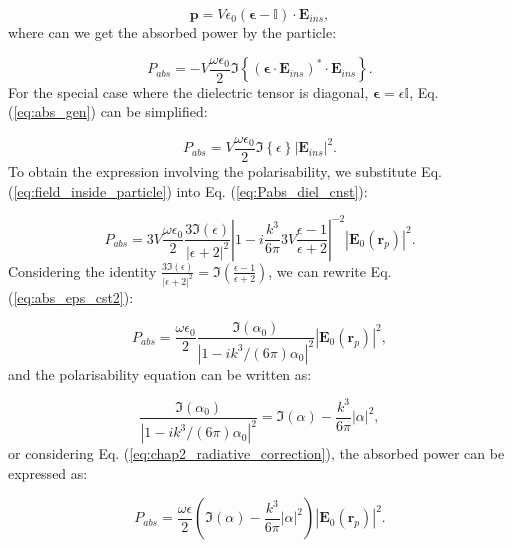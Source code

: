 \begin{equation}
\mathbf{p} = V\epsilon_{0}\left(\boldsymbol{\epsilon}-\mathbb{I}\right)\cdot\mathbf{E}_{ins},
\end{equation}
where can we get the absorbed power by the particle:

\begin{equation}
P_{abs} = -V\frac{\omega \epsilon_0}{2}\Im{\left\{\left(\boldsymbol{\epsilon}\cdot\mathbf{E}_{ins}\right)^{*}\cdot\mathbf{E}_{ins}\right\}}.\label{eq:abs_gen}
\end{equation}
For the special case where the dielectric tensor is diagonal, $\boldsymbol{\epsilon}=\epsilon\mathbb{I}$, Eq. (\ref{eq:abs_gen}) can be simplified:

\begin{equation}
P_{abs} = V\frac{\omega \epsilon_0}{2}\Im{\left\{\epsilon\right\}}\left|\mathbf{E}_{ins}\right|^2.\label{eq:Pabs_diel_cnst}
\end{equation}
To obtain the expression involving the polarisability, we substitute Eq. (\ref{eq:field_inside_particle}) into Eq. (\ref{eq:Pabs_diel_cnst}):

\begin{equation}
P_{abs} = 3V\frac{\omega \epsilon_{0}}{2}\frac{3\Im\left(\epsilon\right)}{\left|\epsilon+2\right|^2}\left|1-i\frac{k^3}{6\pi}3V\frac{\epsilon-1}{\epsilon + 2}\right|^{-2}\left|\mathbf{E}_{0}\left(\mathbf{r}_{p}\right)\right|^2.\label{eq:abs_eps_cst2}
\end{equation}
Considering the identity $ \frac{3\Im{\left(\epsilon\right)}}{\left|\epsilon+2\right|^2}=\Im{\left(\frac{\epsilon-1}{\epsilon + 2}\right)}$, we can rewrite Eq. (\ref{eq:abs_eps_cst2}):

\begin{equation}
P_{abs}= \frac{\omega\epsilon_0}{2}\frac{\Im{\left(\alpha_{0}\right)}}{\left|1-ik^3/\left(6\pi\right)\alpha_0\right|^2}\left|\mathbf{E}_{0}\left(\mathbf{r}_{p}\right)\right|^2,
\end{equation}
and the polarisability equation can be written as:

\begin{equation}
\frac{\Im{\left(\alpha_{0}\right)}}{\left|1-ik^3/\left(6\pi\right)\alpha_0\right|^2}=\Im{\left(\alpha\right)}-\frac{k^3}{6\pi}\left|\alpha\right|^2,
\end{equation}
or considering Eq. (\ref{eq:chap2_radiative_correction}), the absorbed power can be expressed as:

\begin{equation}
P_{abs} = \frac{\omega\epsilon}{2}\left(\Im{\left(\alpha\right)}-\frac{k^3}{6\pi}\left|\alpha\right|^2\right)\left|\mathbf{E}_{0}\left(\mathbf{r}_{p}\right)\right|^2.
\end{equation}

